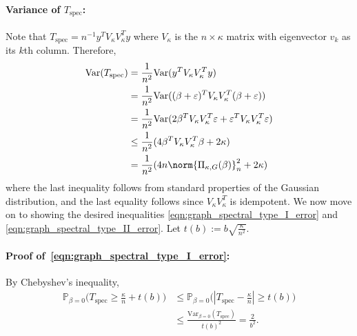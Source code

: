 \documentclass{article}
\newcommand{\abs}[1]{\left \lvert #1 \right \rvert}
\newcommand{\Var}{\mathrm{Var}}
\newcommand{\1}{\mathbf{1}}
\newcommand{\Pbb}{\mathbb{P}}
\newcommand{\spec}{\mathrm{spec}}
\theoremstyle{alden}
\theoremstyle{aldenthm}
\theoremstyle{definition}
\theoremstyle{remark}
\begin{document}
\paragraph{Variance of $T_{\mathrm{spec}}$:}
Note that $T_{\mathrm{spec}} = n^{-1} y^T V_{\kappa} V_{\kappa}^T y$ where $V_{\kappa}$ is the $n \times \kappa$ matrix with eigenvector $v_k$ as its $k$th column. Therefore,
\begin{align*}
\Var(T_{\spec}) & = \frac{1}{n^2} \Var(y^T V_{\kappa} V_{\kappa}^T y) \\
& = \frac{1}{n^2} \Var((\beta + \varepsilon)^T V_{\kappa} V_{\kappa}^T (\beta + \varepsilon)) \\
& = \frac{1}{n^2} \Var(2 \beta^T V_{\kappa} V_{\kappa}^T \varepsilon + \varepsilon^T V_{\kappa} V_{\kappa}^T \varepsilon) \\
& \leq \frac{1}{n^2}(4 \beta^T V_{\kappa} V_{\kappa}^T \beta + 2\kappa) \\
& = \frac{1}{n^2}(4 n \norm{\Pi_{\kappa,G}(\beta)}_n^2 + 2 \kappa)
\end{align*}
where the last inequality follows from standard properties of the Gaussian distribution, and the last equality follows since $V_{\kappa} V_{\kappa}^T$ is idempotent. We now move on to showing the desired inequalities \eqref{eqn:graph_spectral_type_I_error} and \eqref{eqn:graph_spectral_type_II_error}. Let $t(b) := b\sqrt{\frac{\kappa}{n^2}}$.

\paragraph{Proof of~\eqref{eqn:graph_spectral_type_I_error}:} By Chebyshev's inequality,
\begin{align*}
\Pbb_{\beta = 0}\bigl(T_{\spec} \geq \frac{\kappa}{n} + t(b)\bigr)
& \leq \Pbb_{\beta = 0}\bigl(\abs{T_{\spec} - \frac{\kappa}{n}} \geq t(b)\bigr) \\
& \leq \frac{\Var_{\beta = 0}(T_{\spec})}{t(b)^2} = \frac{2}{b^2}.
\end{align*}
\end{document}
